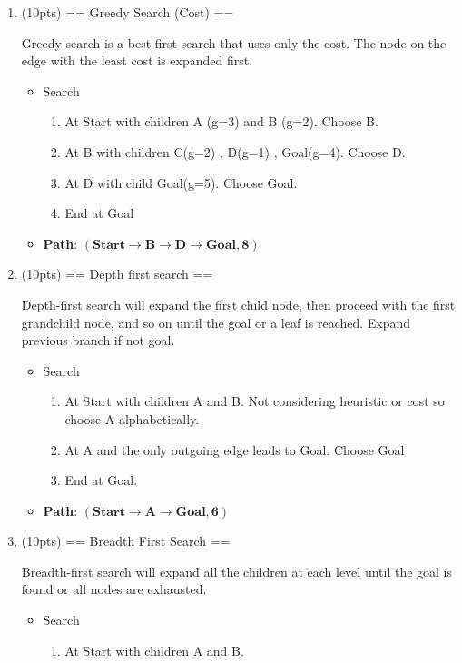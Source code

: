 \documentclass[fleqn]{hermans-hw}
\begin{document}
\begin{enumerate}
\item (10pts) == Greedy Search (Cost) ==

Greedy search is a best-first search that uses only the cost.  The node on the edge with the least cost is expanded first.

\begin{itemize}
	\item Search
	\begin{enumerate}
		\item At Start with children A (g=3) and B (g=2). Choose B.
		\item At B with children C(g=2) , D(g=1) , Goal(g=4). Choose D.
		\item At D with child Goal(g=5). Choose Goal.
		\item End at Goal
	\end{enumerate}
	\item \textbf{Path}: $\mathbf{(Start \rightarrow B \rightarrow D \rightarrow Goal, 8)}$
\end{itemize}

\item (10pts) == Depth first search == 

Depth-first search will expand the first child node, then proceed with the first grandchild node, and so on until the goal or a leaf is reached. Expand previous branch if not goal.

\begin{itemize}
	\item Search
	\begin{enumerate}
		\item At Start with children A and B. Not considering heuristic or cost so choose A alphabetically.
		\item At A and the only outgoing edge leads to Goal. Choose Goal
		\item End at Goal.
	\end{enumerate}
	\item \textbf{Path}: $\mathbf{(Start \rightarrow A \rightarrow Goal, 6)}$
\end{itemize}

\item (10pts) == Breadth First Search ==

Breadth-first search will expand all the children at each level until the goal is found or all nodes are exhausted.

\begin{itemize}
	\item Search
	\begin{enumerate}
		\item At Start with children A and B.
		

\end{enumerate}
\end{itemize}
\end{enumerate}
\end{document}
